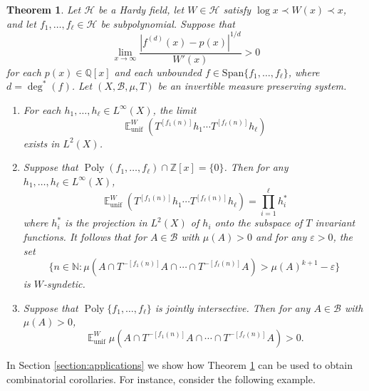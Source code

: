 \documentclass[12pt]{article}
\theoremstyle{plain} %
\theoremstyle{definition} %
\theoremstyle{plain}
\newcounter{MainTheoremCounter}
\newtheorem{maintheorem}[MainTheoremCounter]{Theorem}
\theoremstyle{plain}
\numberwithin{equation}{section}
\newcommand{\N}{\mathbb{N}}
\newcommand{\Z}{\mathbb{Z}}
\newcommand{\Q}{\mathbb{Q}}
\renewcommand{\epsilon}{\varepsilon}
\newcommand{\1}{\mathbbm{1}}
\newcommand{\E}{\operatorname{\mathbb{E}}}
\newcommand{\Poly}{\operatorname{Poly}}
\newcommand{\oo}{\infty}
\newcommand{\round}[1]{[ #1 ]}
\begin{document}
\begin{maintheorem}\label{thm:uniform_main}
     Let $\mathcal{H}$ be a Hardy field, let $W\in \mathcal{H}$ satisfy $
     \log x\prec  W(x)\prec x$, and let $f_1,\dots, f_{\ell}\in \mathcal{H}$ be subpolynomial. Suppose that 
     \begin{equation}\label{eq:thm_B_condition}
         \lim_{x\to\oo}\frac{|f^{(d)}(x)-p(x)|^{1/d}}{W'(x)}>0
     \end{equation}
     for each $p(x)\in \Q[x]$ and each unbounded $f\in \text{Span}\{f_1,\dots, f_{\ell}\}$, where $d = \deg^*(f)$.  
     Let $(X,\mathscr{B},\mu,T)$ be an invertible measure preserving system.
     \begin{enumerate}[label = (\roman*)]
         \item For each $h_1,\dots, h_{\ell}\in L^{\oo}(X)$, the limit
         \begin{equation}\label{eq:uniform_A_1}
         \E_{\text{unif}}^{ W}(T^{\round{f_1(n)}}h_1\cdots T^{\round{f_{\ell}(n)}}h_{\ell})
         \end{equation}
         exists in $L^2(X)$.
        \item Suppose that $\Poly(f_1,\dots, f_{\ell})\cap \Z[x] = \{0\}$. Then for any $h_1,\dots, h_{\ell}\in L^{\oo}(X)$,
        \begin{equation}\label{eq:uniform_A_2}
            \E_{\text{unif}}^{ W}(T^{\round{f_1(n)}}h_1\cdots T^{\round{f_{\ell}(n)}}h_{\ell}) = \prod_{i=1}^{\ell}h_i^*
         \end{equation}
         where $h_i^*$ is the projection in $L^2(X)$ of $h_i$ onto the subspace of $T$ invariant functions. It follows that for $A\in \mathscr{B}$ with $\mu(A)>0$ and for any $\epsilon>0$, the set 
         $$
 \{n\in \N:\mu(A\cap T^{-\round{f_1(n)}}A\cap\cdots \cap T^{-\round{f_{\ell}(n)}}A)>\mu(A)^{k+1}-\epsilon\}
         $$
         is $W$-syndetic.
         \item Suppose that $\Poly\{f_1,\dots, f_{\ell}\}$ is jointly intersective. Then for any $A\in \mathscr{B}$ with $\mu(A)>0$,
        \begin{equation}\label{eq:uniform_A_3}
             \E_{\text{unif}}^{ W}\mu(A\cap T^{-\round{f_1(n)}}A\cap \cdots \cap T^{-\round{f_{\ell}(n)}}A) >0.
         \end{equation}
     \end{enumerate}
\end{maintheorem}

In Section \ref{section:applications} we show how Theorem \ref{thm:uniform_main} can be used to obtain combinatorial corollaries. For instance, consider the following example.
\end{document}
